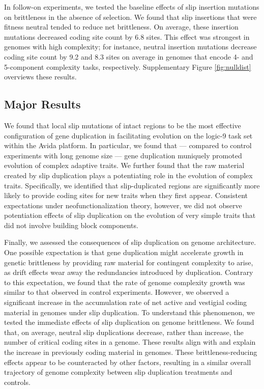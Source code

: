 In follow-on experiments, we tested the baseline effects of slip insertion mutations on brittleness in the absence of selection.
We found that slip insertions that were fitness neutral tended to reduce net brittleness.
On average, these insertion mutations decreased coding site count by 6.8 sites.
This effect was strongest in genomes with high complexity; for instance, neutral insertion mutations decrease coding site count by 9.2 and 8.3 sites on average in genomes that encode 4- and 5-component complexity tasks, respectively.
Supplementary Figure \ref{fig:nulldist} overviews these results.



\subsection{Major Results}

We found that local slip mutations of intact regions to be the most effective configuration of gene duplication in facilitating evolution on the logic-9 task set within the Avida platform.
In particular, we found that --- compared to control experiments with long genome size --- gene duplication muniquely promoted evolution of complex adaptive traits.
We further found that the raw material created by slip duplication plays a potentiating role in the evolution of complex traits.
Specifically, we identified that slip-duplicated regions are significantly more likely to provide coding sites for new traits when they first appear.
Consistent expectations under neofunctionalization theory, however, we did not observe potentiation effects of slip duplication on the evolution of very simple traits that did not involve building block components.

Finally, we assessed the consequences of slip duplication on genome architecture.
One possible expectation is that gene duplication might accelerate growth in genetic brittleness by providing raw material for contingent complexity to arise, as drift effects wear away the redundancies introduced by duplication.
Contrary to this expectation, we found that the rate of genome complexity growth was similar to that observed in control experiments.
However, we observed a significant increase in the accumulation rate of net active and vestigial coding material in genomes under slip duplication.
To understand this phenomenon, we tested the immediate effects of slip duplication on genome brittleness.
We found that, on average, neutral slip duplications decrease, rather than increase, the number of critical coding sites in a genome.
These results align with and explain the increase in previously coding material in genomes.
These brittleness-reducing effects appear to be counteracted by other factors, resulting in a similar overall trajectory of genome complexity between slip duplication treatments and controls.

